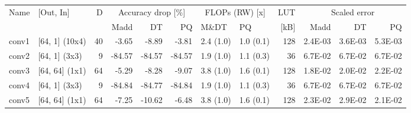 \begin{table}
\centering
\begin{tabular}{llrrrrllrrrr}
\toprule
Name & [Out, In] & D & \multicolumn{3}{|c|}{Accuracy drop [\%]} & \multicolumn{2}{|c|}{FLOPs (RW) [x]} & LUT & \multicolumn{3}{|c|}{Scaled error} \\
 &  &  & Madd & DT & PQ & M\&DT & PQ & [kB] & Madd & DT & PQ \\
\midrule
conv1 & [64, 1] (10x4) & 40 & {\cellcolor[HTML]{F1F9AC}} \color[HTML]{000000} -3.65 & {\cellcolor[HTML]{FEFFBE}} \color[HTML]{000000} -8.89 & {\cellcolor[HTML]{F2FAAE}} \color[HTML]{000000} -3.81 & 2.4 (1.0) & 1.0 (0.1) & 128 & {\cellcolor[HTML]{B7E075}} \color[HTML]{000000} 2.4E-03 & {\cellcolor[HTML]{BDE379}} \color[HTML]{000000} 3.6E-03 & {\cellcolor[HTML]{C5E67E}} \color[HTML]{000000} 5.3E-03 \\
conv2 & [64, 1] (3x3) & 9 & {\cellcolor[HTML]{A50026}} \color[HTML]{F1F1F1} -84.57 & {\cellcolor[HTML]{A50026}} \color[HTML]{F1F1F1} -84.57 & {\cellcolor[HTML]{A50026}} \color[HTML]{F1F1F1} -84.57 & 1.9 (1.0) & 1.1 (0.3) & 36 & {\cellcolor[HTML]{B30D26}} \color[HTML]{F1F1F1} 6.7E-02 & {\cellcolor[HTML]{B30D26}} \color[HTML]{F1F1F1} 6.7E-02 & {\cellcolor[HTML]{B30D26}} \color[HTML]{F1F1F1} 6.7E-02 \\
conv3 & [64, 64] (1x1) & 64 & {\cellcolor[HTML]{F5FBB2}} \color[HTML]{000000} -5.29 & {\cellcolor[HTML]{FDFEBC}} \color[HTML]{000000} -8.28 & {\cellcolor[HTML]{FFFEBE}} \color[HTML]{000000} -9.07 & 3.8 (1.0) & 1.6 (0.1) & 128 & {\cellcolor[HTML]{F8FCB6}} \color[HTML]{000000} 1.8E-02 & {\cellcolor[HTML]{FFFEBE}} \color[HTML]{000000} 2.0E-02 & {\cellcolor[HTML]{FFF7B2}} \color[HTML]{000000} 2.2E-02 \\
conv4 & [64, 1] (3x3) & 9 & {\cellcolor[HTML]{A50026}} \color[HTML]{F1F1F1} -84.84 & {\cellcolor[HTML]{A50026}} \color[HTML]{F1F1F1} -84.77 & {\cellcolor[HTML]{A50026}} \color[HTML]{F1F1F1} -84.84 & 1.9 (1.0) & 1.1 (0.3) & 36 & {\cellcolor[HTML]{B71126}} \color[HTML]{F1F1F1} 6.7E-02 & {\cellcolor[HTML]{B71126}} \color[HTML]{F1F1F1} 6.7E-02 & {\cellcolor[HTML]{B71126}} \color[HTML]{F1F1F1} 6.7E-02 \\
conv5 & [64, 64] (1x1) & 64 & {\cellcolor[HTML]{FBFDBA}} \color[HTML]{000000} -7.25 & {\cellcolor[HTML]{FFFCBA}} \color[HTML]{000000} -10.62 & {\cellcolor[HTML]{F8FCB6}} \color[HTML]{000000} -6.48 & 3.8 (1.0) & 1.6 (0.1) & 128 & {\cellcolor[HTML]{FFF5AE}} \color[HTML]{000000} 2.3E-02 & {\cellcolor[HTML]{FEE28F}} \color[HTML]{000000} 2.9E-02 & {\cellcolor[HTML]{FFFAB6}} \color[HTML]{000000} 2.1E-02 \\

\end{tabular}
\end{table}
